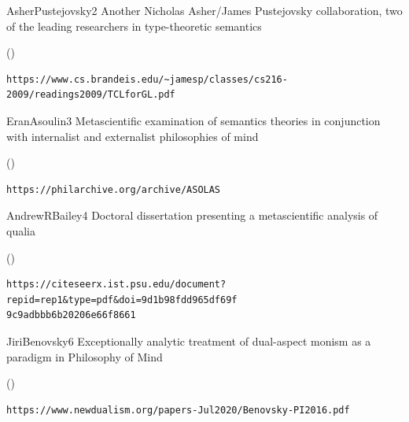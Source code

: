 
\begin{bsuppItem}{AsherPustejovsky}{2}
{Another Nicholas Asher/James Pustejovsky collaboration, two of the leading 
researchers in type-theoretic semantics}
\begin{lboxurl}(\currhref)
\begin{lstlisting}
https://www.cs.brandeis.edu/~jamesp/classes/cs216-2009/readings2009/TCLforGL.pdf
\end{lstlisting}
\end{lboxurl}
\end{bsuppItem}

\begin{bsuppItem}{EranAsoulin}{3}
{Metascientific examination of semantics theories in conjunction with internalist and externalist philosophies of mind}
\begin{lboxurl}(\currhref)
\begin{lstlisting}
https://philarchive.org/archive/ASOLAS
\end{lstlisting}
\end{lboxurl}
\end{bsuppItem}

\begin{bsuppItem}{AndrewRBailey}{4}
{Doctoral dissertation presenting a metascientific analysis of qualia}
\begin{lboxurl}(\currhref)
\begin{lstlisting}
https://citeseerx.ist.psu.edu/document?repid=rep1&type=pdf&doi=9d1b98fdd965df69f
9c9adbbb6b20206e66f8661
\end{lstlisting}
\end{lboxurl}
\end{bsuppItem}

\begin{bsuppItem}{JiriBenovsky}{6}
{Exceptionally analytic treatment of dual-aspect monism as a paradigm in Philosophy of Mind}
\begin{lboxurl}(\currhref)
\begin{lstlisting}
https://www.newdualism.org/papers-Jul2020/Benovsky-PI2016.pdf
\end{lstlisting}
\end{lboxurl}
\end{bsuppItem}

